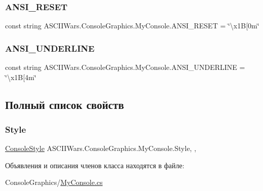 \subsubsection{\texorpdfstring{A\+N\+S\+I\+\_\+\+R\+E\+S\+ET}{ANSI\_RESET}}
{\footnotesize\ttfamily const string A\+S\+C\+I\+I\+Wars.\+Console\+Graphics.\+My\+Console.\+A\+N\+S\+I\+\_\+\+R\+E\+S\+ET = \char`\"{}\textbackslash{}x1B\mbox{[}0m\char`\"{}}

\hypertarget{class_a_s_c_i_i_wars_1_1_console_graphics_1_1_my_console_a1730e5dfb4c14b688b5d7451c4a71e30}{}\label{class_a_s_c_i_i_wars_1_1_console_graphics_1_1_my_console_a1730e5dfb4c14b688b5d7451c4a71e30} 
\subsubsection{\texorpdfstring{A\+N\+S\+I\+\_\+\+U\+N\+D\+E\+R\+L\+I\+NE}{ANSI\_UNDERLINE}}
{\footnotesize\ttfamily const string A\+S\+C\+I\+I\+Wars.\+Console\+Graphics.\+My\+Console.\+A\+N\+S\+I\+\_\+\+U\+N\+D\+E\+R\+L\+I\+NE = \char`\"{}\textbackslash{}x1B\mbox{[}4m\char`\"{}}



\subsection{Полный список свойств}
\hypertarget{class_a_s_c_i_i_wars_1_1_console_graphics_1_1_my_console_a2a25ec7c9c245a9a479453f71bd30c2d}{}\label{class_a_s_c_i_i_wars_1_1_console_graphics_1_1_my_console_a2a25ec7c9c245a9a479453f71bd30c2d} 
\subsubsection{\texorpdfstring{Style}{Style}}
{\footnotesize\ttfamily \hyperlink{namespace_a_s_c_i_i_wars_1_1_console_graphics_a9b323f4b2bf48062c9245b24e74b2882}{Console\+Style} A\+S\+C\+I\+I\+Wars.\+Console\+Graphics.\+My\+Console.\+Style\hspace{0.3cm}{\ttfamily [static]}, {\ttfamily [get]}, {\ttfamily [set]}}



Объявления и описания членов класса находятся в файле\+:\begin{DoxyCompactItemize}
\item 
Console\+Graphics/\hyperlink{_my_console_8cs}{My\+Console.\+cs}\end{DoxyCompactItemize}
